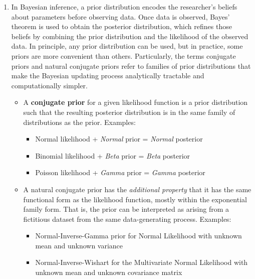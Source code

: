 \begin{enumerate}
\item
In Bayesian inference, a prior distribution encodes the researcher's beliefs about parameters before observing data.
Once data is observed, Bayes' theorem is used to obtain the posterior distribution,
  which refines those beliefs by combining the prior distribution and the likelihood of the observed data.
In principle, any prior distribution can be used, but in practice, some priors are more convenient than others.
Particularly, the terms conjugate priors and natural conjugate priors refer to families of prior distributions
  that make the Bayesian updating process analytically tractable and computationally simpler.
\begin{itemize}
\item A \textbf{conjugate prior} for a given likelihood function is a prior distribution
  such that the resulting posterior distribution is in the same family of distributions as the prior.
Examples:
  \begin{itemize}
  \item Normal likelihood + \emph{Normal} prior = \emph{Normal} posterior
  \item Binomial likelihood + \emph{Beta} prior = \emph{Beta} posterior
  \item Poisson likelihood + \emph{Gamma} prior = \emph{Gamma} posterior
  \end{itemize}
\item A natural conjugate prior has the \emph{additional property} that it has the same
  functional form as the likelihood function,
  mostly within the exponential family form.
That is, the prior can be interpreted as arising from a fictitious dataset from the same data-generating process.
Examples:
  \begin{itemize}
  \item Normal-Inverse-Gamma prior for Normal Likelihood with unknown mean and unknown variance
  \item Normal-Inverse-Wishart for the Multivariate Normal Likelihood with unknown mean and unknown covariance matrix
  \end{itemize}
\end{itemize}


\end{enumerate}
